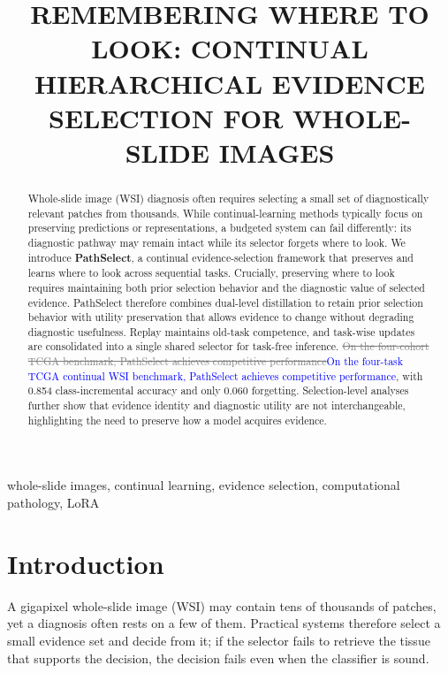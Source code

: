 \documentclass{article}
\title{REMEMBERING WHERE TO LOOK: CONTINUAL HIERARCHICAL EVIDENCE SELECTION FOR WHOLE-SLIDE IMAGES}
\newif\ifmarkup \markuptrue
\newcommand{\del}[1]{\ifmarkup\textcolor{gray}{\sout{#1}}\fi}
\newcommand{\ins}[1]{\ifmarkup\textcolor{blue}{#1}\else#1\fi}
\newcommand{\rep}[2]{\del{#1}\ins{#2}}
\begin{document}
\ninept
\maketitle

\begin{abstract}
Whole-slide image (WSI) diagnosis often requires selecting a small set of diagnostically relevant patches from thousands. While continual-learning methods typically focus on preserving predictions or representations, a budgeted system can fail differently: its diagnostic pathway may remain intact while its selector forgets where to look. We introduce \textbf{PathSelect}, a continual evidence-selection framework that preserves and learns where to look across sequential tasks. Crucially, preserving where to look requires maintaining both prior selection behavior and the diagnostic value of selected evidence. PathSelect therefore combines dual-level distillation to retain prior selection behavior with utility preservation that allows evidence to change without degrading diagnostic usefulness. Replay maintains old-task competence, and task-wise updates are consolidated into a single shared selector for task-free inference. \rep{On the four-cohort TCGA benchmark, PathSelect achieves competitive performance}{On the four-task TCGA continual WSI benchmark, PathSelect achieves competitive performance}, with 0.854 class-incremental accuracy and only 0.060 forgetting. Selection-level analyses further show that evidence identity and diagnostic utility are not interchangeable, highlighting the need to preserve how a model acquires evidence.
\end{abstract}

\begin{keywords}
whole-slide images, continual learning, evidence selection, computational pathology, LoRA
\end{keywords}

\section{Introduction}
\label{sec:intro}

A gigapixel whole-slide image (WSI) may contain tens of thousands of patches, yet a diagnosis often rests on a few of them. Practical systems therefore select a small evidence set and decide from it; if the selector fails to retrieve the tissue that supports the decision, the decision fails even when the classifier is sound.
\end{document}
